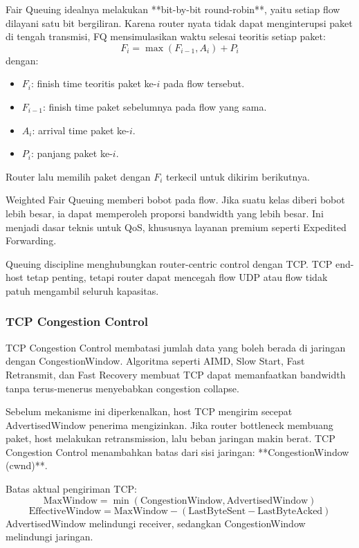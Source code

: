 Fair Queuing idealnya melakukan **bit-by-bit round-robin**, yaitu setiap flow dilayani satu bit bergiliran. Karena router nyata tidak dapat menginterupsi paket di tengah transmisi, FQ mensimulasikan waktu selesai teoritis setiap paket:
\[
    F_i = \max(F_{i-1}, A_i) + P_i
\]
dengan:
\begin{itemize}
    \item $F_i$: finish time teoritis paket ke-$i$ pada flow tersebut.
    \item $F_{i-1}$: finish time paket sebelumnya pada flow yang sama.
    \item $A_i$: arrival time paket ke-$i$.
    \item $P_i$: panjang paket ke-$i$.
\end{itemize}
Router lalu memilih paket dengan $F_i$ terkecil untuk dikirim berikutnya.

Weighted Fair Queuing memberi bobot pada flow. Jika suatu kelas diberi bobot lebih besar, ia dapat memperoleh proporsi bandwidth yang lebih besar. Ini menjadi dasar teknis untuk QoS, khususnya layanan premium seperti Expedited Forwarding.

Queuing discipline menghubungkan router-centric control dengan TCP. TCP end-host tetap penting, tetapi router dapat mencegah flow UDP atau flow tidak patuh mengambil seluruh kapasitas.

\subsubsection{TCP Congestion Control}
\begin{jawab}
TCP Congestion Control membatasi jumlah data yang boleh berada di jaringan dengan CongestionWindow. Algoritma seperti AIMD, Slow Start, Fast Retransmit, dan Fast Recovery membuat TCP dapat memanfaatkan bandwidth tanpa terus-menerus menyebabkan congestion collapse.
\end{jawab}

Sebelum mekanisme ini diperkenalkan, host TCP mengirim secepat AdvertisedWindow penerima mengizinkan. Jika router bottleneck membuang paket, host melakukan retransmission, lalu beban jaringan makin berat. TCP Congestion Control menambahkan batas dari sisi jaringan: **CongestionWindow (cwnd)**.

Batas aktual pengiriman TCP:
\[
    \text{MaxWindow} =
    \min(\text{CongestionWindow}, \text{AdvertisedWindow})
\]
\[
    \text{EffectiveWindow} =
    \text{MaxWindow} - (\text{LastByteSent}-\text{LastByteAcked})
\]
AdvertisedWindow melindungi receiver, sedangkan CongestionWindow melindungi jaringan.

